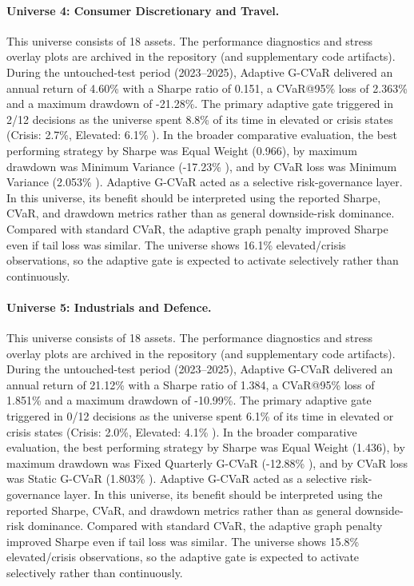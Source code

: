 \documentclass[11pt]{article}
\begin{document}
\paragraph{Universe 4: Consumer Discretionary and Travel.}
This universe consists of 18 assets. The performance diagnostics and stress overlay plots are archived in the repository (and supplementary code artifacts). During the untouched-test period (2023--2025), Adaptive G-CVaR delivered an annual return of 4.60\% with a Sharpe ratio of 0.151, a CVaR@95\% loss of 2.363\% and a maximum drawdown of -21.28\%. The primary adaptive gate triggered in 2/12 decisions as the universe spent 8.8\% of its time in elevated or crisis states (Crisis: 2.7\%, Elevated: 6.1\% ). In the broader comparative evaluation, the best performing strategy by Sharpe was Equal Weight (0.966), by maximum drawdown was Minimum Variance (-17.23\% ), and by CVaR loss was Minimum Variance (2.053\% ). Adaptive G-CVaR acted as a selective risk-governance layer. In this universe, its benefit should be interpreted using the reported Sharpe, CVaR, and drawdown metrics rather than as general downside-risk dominance. Compared with standard CVaR, the adaptive graph penalty improved Sharpe even if tail loss was similar. The universe shows 16.1\% elevated/crisis observations, so the adaptive gate is expected to activate selectively rather than continuously.

\paragraph{Universe 5: Industrials and Defence.}
This universe consists of 18 assets. The performance diagnostics and stress overlay plots are archived in the repository (and supplementary code artifacts). During the untouched-test period (2023--2025), Adaptive G-CVaR delivered an annual return of 21.12\% with a Sharpe ratio of 1.384, a CVaR@95\% loss of 1.851\% and a maximum drawdown of -10.99\%. The primary adaptive gate triggered in 0/12 decisions as the universe spent 6.1\% of its time in elevated or crisis states (Crisis: 2.0\%, Elevated: 4.1\% ). In the broader comparative evaluation, the best performing strategy by Sharpe was Equal Weight (1.436), by maximum drawdown was Fixed Quarterly G-CVaR (-12.88\% ), and by CVaR loss was Static G-CVaR (1.803\% ). Adaptive G-CVaR acted as a selective risk-governance layer. In this universe, its benefit should be interpreted using the reported Sharpe, CVaR, and drawdown metrics rather than as general downside-risk dominance. Compared with standard CVaR, the adaptive graph penalty improved Sharpe even if tail loss was similar. The universe shows 15.8\% elevated/crisis observations, so the adaptive gate is expected to activate selectively rather than continuously.
\end{document}
